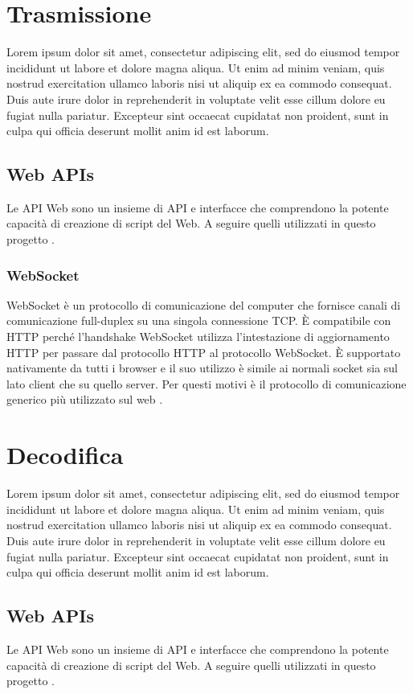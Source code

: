 \section{Trasmissione}
Lorem ipsum dolor sit amet, consectetur adipiscing elit, sed do eiusmod tempor incididunt ut labore et dolore magna aliqua. Ut enim ad minim veniam, quis nostrud exercitation ullamco laboris nisi ut aliquip ex ea commodo consequat. Duis aute irure dolor in reprehenderit in voluptate velit esse cillum dolore eu fugiat nulla pariatur. Excepteur sint occaecat cupidatat non proident, sunt in culpa qui officia deserunt mollit anim id est laborum.

\subsection{Web APIs}
Le API Web sono un insieme di API e interfacce che comprendono la potente capacità di creazione di script del Web. A seguire quelli utilizzati in questo progetto \parencite{Web_APIs}.

\subsubsection{WebSocket}
WebSocket è un protocollo di comunicazione del computer che fornisce canali di comunicazione full-duplex su una singola connessione TCP. È compatibile con HTTP perché l'handshake WebSocket utilizza l'intestazione di aggiornamento HTTP per passare dal protocollo HTTP al protocollo WebSocket. È supportato nativamente da tutti i browser e il suo utilizzo è simile ai normali socket sia sul lato client che su quello server. Per questi motivi è il protocollo di comunicazione generico più utilizzato sul web \parencite{WebSocket_Web_APIs}.




\section{Decodifica}
Lorem ipsum dolor sit amet, consectetur adipiscing elit, sed do eiusmod tempor incididunt ut labore et dolore magna aliqua. Ut enim ad minim veniam, quis nostrud exercitation ullamco laboris nisi ut aliquip ex ea commodo consequat. Duis aute irure dolor in reprehenderit in voluptate velit esse cillum dolore eu fugiat nulla pariatur. Excepteur sint occaecat cupidatat non proident, sunt in culpa qui officia deserunt mollit anim id est laborum.

\subsection{Web APIs}
Le API Web sono un insieme di API e interfacce che comprendono la potente capacità di creazione di script del Web. A seguire quelli utilizzati in questo progetto \parencite{Web_APIs}.


